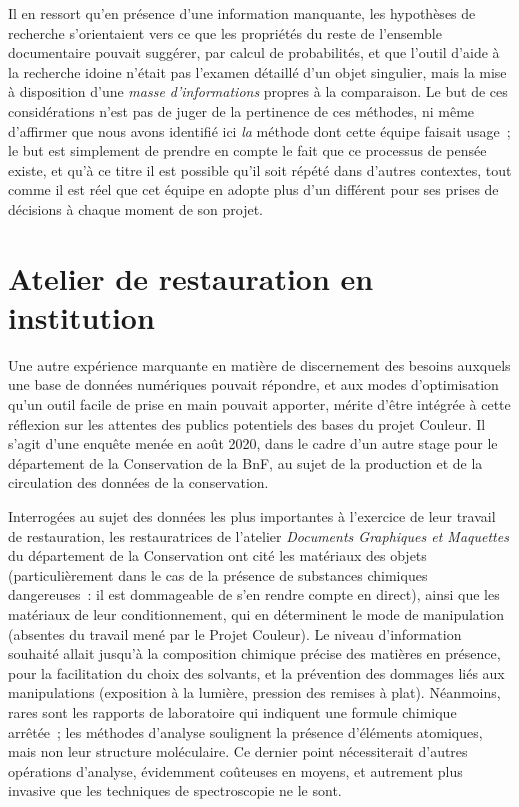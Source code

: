 \documentclass[a4paper,12pt, twoside]{book}
\begin{document}
Il en ressort qu’en présence d’une information manquante, les hypothèses de recherche s’orientaient vers ce que les propriétés du reste de l’ensemble documentaire pouvait suggérer, par calcul de probabilités, et que l’outil d’aide à la recherche idoine n’était pas l’examen détaillé d’un objet singulier, mais la mise à disposition d’une \textit{masse d’informations} propres à la comparaison. Le but de ces considérations n’est pas de juger de la pertinence de ces méthodes, ni même d’affirmer que nous avons identifié ici \textit{la} méthode dont cette équipe faisait usage~; le but est simplement de prendre en compte le fait que ce processus de pensée existe, et qu’à ce titre il est possible qu’il soit répété dans d’autres contextes, tout comme il est réel que cet équipe en adopte plus d’un différent pour ses prises de décisions à chaque moment de son projet.

\section*{Atelier de restauration en institution}

Une autre expérience marquante en matière de discernement des besoins auxquels une base de données numériques pouvait répondre, et aux modes d’optimisation qu’un outil facile de prise en main pouvait apporter, mérite d’être intégrée à cette réflexion sur les attentes des publics potentiels des bases du projet Couleur. Il s’agit d’une enquête menée en août 2020, dans le cadre d’un autre stage pour le département de la Conservation de la BnF, au sujet de la production et de la circulation des données de la conservation.

Interrogées au sujet des données les plus importantes à l’exercice de leur travail de restauration, les restauratrices de l’atelier \emph{Documents Graphiques et Maquettes} du département de la Conservation ont cité les matériaux des objets (particulièrement dans le cas de la présence de substances chimiques dangereuses~: il est dommageable de s’en rendre compte en direct), ainsi que les matériaux de leur conditionnement, qui en déterminent le mode de manipulation (absentes du travail mené par le Projet Couleur). Le niveau d’information souhaité allait jusqu’à la composition chimique précise des matières en présence, pour la facilitation du choix des solvants, et la prévention des dommages liés aux manipulations (exposition à la lumière, pression des remises à plat). Néanmoins, rares sont les rapports de laboratoire qui indiquent une formule chimique arrêtée~; les méthodes d’analyse soulignent la présence d’éléments atomiques, mais non leur structure moléculaire. Ce dernier point nécessiterait d’autres opérations d’analyse, évidemment coûteuses en moyens, et autrement plus invasive que les techniques de spectroscopie ne le sont.
\end{document}

